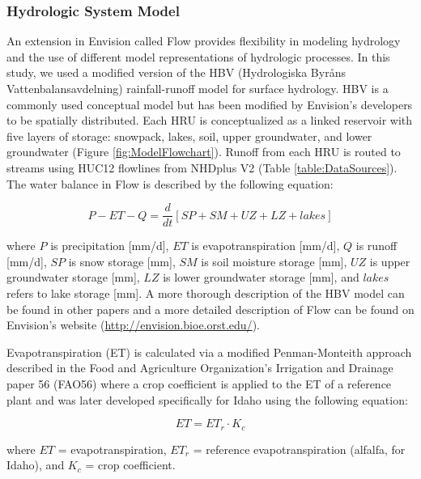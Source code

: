 \documentclass[11pt,letterpaper]{article}
\begin{document}
\subsubsection{Hydrologic System Model}

An extension in Envision called Flow provides flexibility in modeling hydrology and the use of different model representations of hydrologic processes. In this study, we used a modified version of the HBV (Hydrologiska Byr\r{a}ns Vattenbalansavdelning) rainfall-runoff model \citep{Bergstrom:1976tr} for surface hydrology. HBV is a commonly used conceptual model \citep{Seibert:2000wi,Woodsmith:2007vz,Abebe:2010to,Bergstrom:2015ck} but has been modified by Envision’s developers to be spatially distributed. Each HRU is conceptualized as a linked reservoir with five layers of storage: snowpack, lakes, soil, upper groundwater, and lower groundwater (Figure \ref{fig:ModelFlowchart}). Runoff from each HRU is routed to streams using HUC12 flowlines from NHDplus V2 (Table \ref{table:DataSources}). The water balance in Flow is described by the following equation:

\begin{equation}
P - ET - Q = \frac{d}{dt}\left[SP + SM + UZ + LZ + lakes\right]
\end{equation}

where $P$ is precipitation [mm/d], $ET$ is evapotranspiration [mm/d], $Q$ is runoff [mm/d], $SP$ is snow storage [mm], $SM$ is soil moisture storage [mm], $UZ$ is upper groundwater storage [mm], $LZ$ is lower groundwater storage [mm], and $lakes$ refers to lake storage [mm]. A more thorough description of the HBV model can be found in other papers \citep{Seibert:1999vg,Bergstrom:2015ck} and a more detailed description of Flow can be found on Envision’s website (\href{http://envision.bioe.orst.edu/}{http://envision.bioe.orst.edu/}).

Evapotranspiration (ET) is calculated via a modified Penman-Monteith approach described in the Food and Agriculture Organization’s Irrigation and Drainage paper 56 (FAO56) where a crop coefficient is applied to the ET of a reference plant \citep{Allen:vn} and was later developed specifically for Idaho \citep{Allen:2007ta} using the following equation:

\begin{equation}
ET = ET_r \cdot K_c
\end{equation}

where $ET$ = evapotranspiration, $ET_r$ = reference evapotranspiration (alfalfa, for Idaho), and $K_c$ = crop coefficient.
\end{document}

